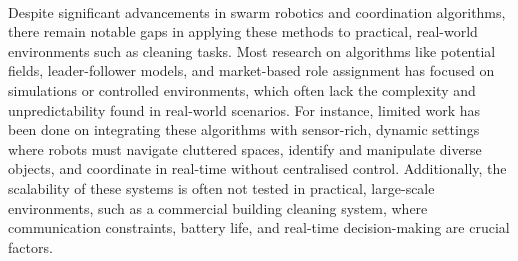 \paragraph*{}
Despite significant advancements in swarm robotics and coordination algorithms, there remain notable gaps in applying these methods to practical, real-world environments such as cleaning tasks. Most research on algorithms like potential fields, leader-follower models, and market-based role assignment has focused on simulations or controlled environments, which often lack the complexity and unpredictability found in real-world scenarios. For instance, limited work has been done on integrating these algorithms with sensor-rich, dynamic settings where robots must navigate cluttered spaces, identify and manipulate diverse objects, and coordinate in real-time without centralised control. Additionally, the scalability of these systems is often not tested in practical, large-scale environments, such as a commercial building cleaning system, where communication constraints, battery life, and real-time decision-making are crucial factors.

\paragraph*{}